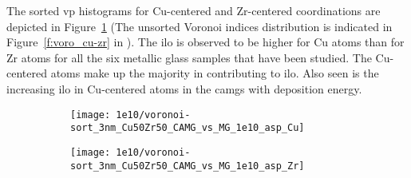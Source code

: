 The sorted \gls{vp} histograms for Cu-centered and Zr-centered coordinations are depicted in Figure~\ref{f:vorosort_cu-zr} (The unsorted Voronoi indices distribution is indicated in Figure~\ref{f:voro_cu-zr} in ). The \gls{ilo} is observed to be higher for Cu atoms than for Zr atoms for all the six metallic glass samples that have been studied. The Cu-centered atoms make up the majority in contributing to \gls{ilo}. Also seen is the increasing \gls{ilo} in Cu-centered atoms in the \gls{camg}s with deposition energy. \par

\begin{figure}[!ht]
	\centering
	\begin{subfigure}{0.5\linewidth} \centering \texttt{[image: 1e10/voronoi-sort\_3nm\_Cu50Zr50\_CAMG\_vs\_MG\_1e10\_asp\_Cu]} 
		\subcaption{} \end{subfigure}%
	\hfill
	\begin{subfigure}{0.5\linewidth} \centering \texttt{[image: 1e10/voronoi-sort\_3nm\_Cu50Zr50\_CAMG\_vs\_MG\_1e10\_asp\_Zr]}
		\subcaption{} \end{subfigure}
	\label{f:vorosort_cu-zr}
\end{figure}


